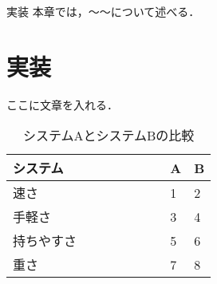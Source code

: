 \chapterhead
{実装}
{本章では，〜〜について述べる．}


\section{実装}
ここに文章を入れる．
\begin{table}[h]
  \begin{center}
    \caption{システムAとシステムBの比較}
    \begin{tabular}{|l|l|l|} \hline
         システム　　 & A & B \\ \hline
         速さ 　　　　　　　　　& 1 & 2 \\ \hline
         手軽さ 　　　　　　& 3 & 4 \\ \hline
         持ちやすさ & 5 & 6 \\ \hline
         重さ　　　　　　　　　 & 7 & 8 \\ \hline
    \end{tabular}
    \label{tb:angle}
  \end{center}
\end{table}


\newpage

